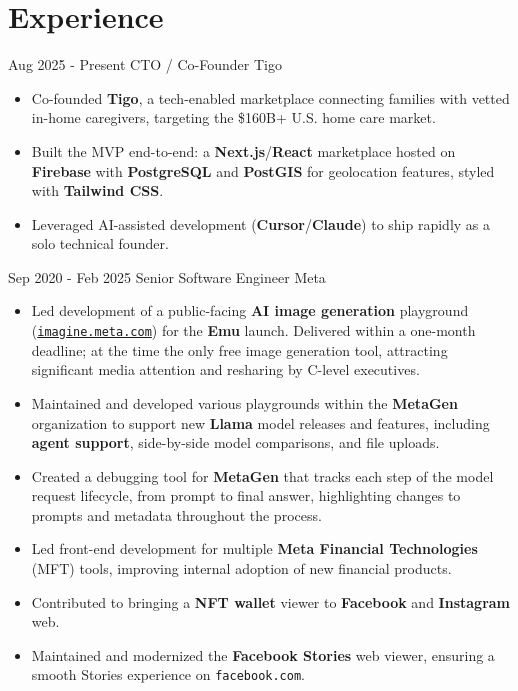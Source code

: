 \documentclass[]{friggeri-cv}
\begin{document}
\section{Experience}
\begin{entrylist}
    \entry
    {Aug 2025 - Present}
    {CTO / Co-Founder}
    {Tigo}
    {\begin{itemize}[nosep, leftmargin=1em, topsep=2pt]
        \item Co-founded \textbf{Tigo}, a tech-enabled marketplace connecting families with vetted in-home caregivers, targeting the \$160B+ U.S. home care market.
        \item Built the MVP end-to-end: a \textbf{Next.js}/\textbf{React} marketplace hosted on \textbf{Firebase} with \textbf{PostgreSQL} and \textbf{PostGIS} for geolocation features, styled with \textbf{Tailwind CSS}.
        \item Leveraged AI-assisted development (\textbf{Cursor}/\textbf{Claude}) to ship rapidly as a solo technical founder.
    \end{itemize}}

    \entry
    {Sep 2020 - Feb 2025}
    {Senior Software Engineer}
    {Meta}
    {\begin{itemize}[nosep, leftmargin=1em, topsep=2pt]
        \item Led development of a public-facing \textbf{AI image generation} playground (\href{https://about.fb.com/news/2023/12/meta-ai-updates/}{\texttt{imagine.meta.com}}) for the \textbf{Emu} launch. Delivered within a one-month deadline; at the time the only free image generation tool, attracting significant media attention and resharing by C-level executives.
        \item Maintained and developed various playgrounds within the \textbf{MetaGen} organization to support new \textbf{Llama} model releases and features, including \textbf{agent support}, side-by-side model comparisons, and file uploads.
        \item Created a debugging tool for \textbf{MetaGen} that tracks each step of the model request lifecycle, from prompt to final answer, highlighting changes to prompts and metadata throughout the process.
        \item Led front-end development for multiple \textbf{Meta Financial Technologies} (MFT) tools, improving internal adoption of new financial products.
        \item Contributed to bringing a \textbf{NFT wallet} viewer to \textbf{Facebook} and \textbf{Instagram} web.
        \item Maintained and modernized the \textbf{Facebook Stories} web viewer, ensuring a smooth Stories experience on \texttt{facebook.com}.
    \end{itemize}}


\end{entrylist}
\end{document}
